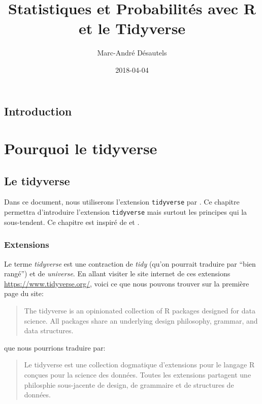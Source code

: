 \documentclass[]{book}
\title{Statistiques et Probabilités avec R et le Tidyverse}
\author{Marc-André Désautels}
\date{2018-04-04}
\begin{document}
\maketitle

{
\setcounter{tocdepth}{1}
\tableofcontents
}
\chapter*{Introduction}\label{introduction}

\part{Pourquoi le
tidyverse}\label{part-pourquoi-le-tidyverse}

\chapter{Le tidyverse}\label{tidyverse}

Dans ce document, nous utiliserons l'extension \texttt{tidyverse} par
\citep{R-tidyverse}. Ce chapitre permettra d'introduire l'extension
\texttt{tidyverse} mais surtout les principes qui la sous-tendent. Ce
chapitre est inspiré de \citep{juba2018} et \citep{wickham2017}.

\section{Extensions}\label{extensions}

Le terme \emph{tidyverse} est une contraction de \emph{tidy} (qu'on
pourrait traduire par ``bien rangé'') et de \emph{universe}. En allant
visiter le site internet de ces extensions
\url{https://www.tidyverse.org/}, voici ce que nous pouvons trouver sur
la première page du site:

\begin{quote}
The tidyverse is an opinionated collection of R packages designed for
data science. All packages share an underlying design philosophy,
grammar, and data structures.
\end{quote}

que nous pourrions traduire par:

\begin{quote}
Le tidyverse est une collection dogmatique d'extensions pour le langage
R conçues pour la science des données. Toutes les extensions partagent
une philosphie sous-jacente de design, de grammaire et de structures de
données.
\end{quote}
\end{document}

